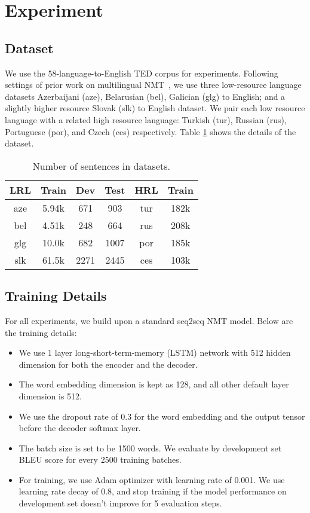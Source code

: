 \section{\label{sec:exp}Experiment}

\subsection{Dataset}
We use the 58-language-to-English TED corpus for experiments. Following settings of prior work on multilingual NMT~\citep{rapid_adapt_nmt,ted_pretrain_emb}, we use three low-resource language datasets Azerbaijani
(aze), Belarusian (bel), Galician (glg) to English; and a slightly higher resource Slovak (slk) to English dataset. We pair each low resource language with a related high resource language: Turkish (tur), Russian (rus), Portuguese (por), and Czech (ces) respectively. Table \ref{tab:data} shows the details of the dataset.

\begin{table}[h]
    \centering
    \begin{tabular}{c|ccc|cc}
    LRL & Train & Dev & Test & HRL & Train \\
    \midrule
    aze & 5.94k & 671 & 903 & tur & 182k\\
    bel & 4.51k & 248 & 664 & rus & 208k\\
    glg & 10.0k & 682 & 1007 & por & 185k \\
    slk & 61.5k & 2271 & 2445 & ces & 103k\\
    \end{tabular}
    \caption{Number of sentences in datasets.}
    \label{tab:data}
\end{table}

\subsection{Training Details}
For all experiments, we build upon a standard seq2seq NMT model. Below are the training details:
\begin{itemize}
    \item We use 1 layer long-short-term-memory (LSTM) network with 512 hidden dimension for both the encoder and the decoder. 
    \item The word embedding dimension is kept as 128, and all other default layer dimension is 512. 
    \item We use the dropout rate of 0.3 for the word embedding and the output tensor before the decoder softmax layer.
    \item The batch size is set to be 1500 words. We evaluate by development set BLEU score for every 2500 training batches. 
    \item For training, we use Adam optimizer with learning rate of 0.001. We use learning rate decay of 0.8, and stop training if the model performance on development set doesn't improve for 5 evaluation steps.
\end{itemize}

